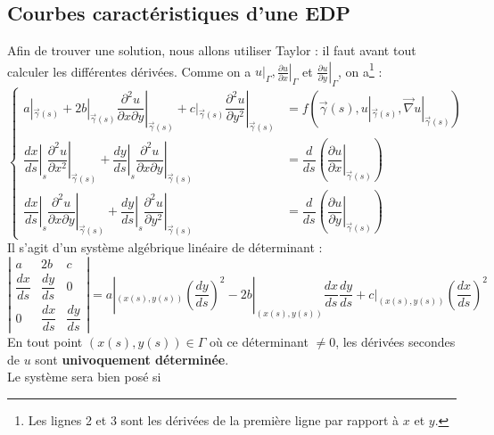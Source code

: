 \documentclass[11pt, a4paper, openany]{book}
\begin{document}
			\subsection{Courbes caractéristiques d'une EDP}
			Afin de trouver une solution, nous allons utiliser Taylor : il faut avant tout calculer les différentes dérivées. Comme on a $u|_\Gamma, \left.\frac{\partial u}{\partial x}\right|_\Gamma$ et $\left.\frac{\partial u}{\partial y}\right|_\Gamma$, on a\footnote{Les lignes 2 et 3 sont les dérivées de la première ligne par rapport à $x$ et $y$.} :
			\begin{equation}
				\left\{\begin{array}{ll}
				a|_{\vec{\gamma}(s)} + 2b|_{\vec{\gamma}(s)}\left.\dfrac{\partial^2 u}{\partial x \partial y}\right|_{\vec{\gamma}(s)} + c|_{\vec{\gamma}(s)}\left.\dfrac{\partial^2u}{\partial y^2}\right|_{\vec{\gamma}(s)} &= f(\vec{\gamma}(s), u|_{\vec{\gamma}(s)}, \vec \nabla u|_{\vec{\gamma}(s)})\\
				\left.\dfrac{dx}{ds}\right|_{s}\left.\dfrac{\partial^2u}{\partial x^2}\right|_{\vec{\gamma}(s)} + \left.\dfrac{dy}{ds}\right|_{s}\left.\dfrac{\partial^2u}{\partial x\partial y}\right|_{\vec{\gamma}(s)} &= \dfrac{d}{ds}\left(\left.\dfrac{\partial u}{\partial x}\right|_{\vec{\gamma}(s)}\right)\\
				\left.\dfrac{dx}{ds}\right|_{s}\left.\dfrac{\partial^2u}{\partial x\partial y}\right|_{\vec{\gamma}(s)} + \left.\dfrac{dy}{ds}\right|_{s}\left.\dfrac{\partial^2u}{\partial y^2}\right|_{\vec{\gamma}(s)} &= \dfrac{d}{ds}\left(\left.\dfrac{\partial u}{\partial y}\right|_{\vec{\gamma}(s)}\right)
				\end{array}\right.
			\end{equation}
			Il s'agit d'un système algébrique linéaire de déterminant  :
			\begin{equation}
				\left|\begin{array}{ccc}
				a & 2b & c\\
				\dfrac{dx}{ds} & \dfrac{dy}{ds} & 0\\
				0 & \dfrac{dx}{ds} & \dfrac{dy}{ds}
				\end{array}\right| = a|_{(x(s),y(s))} \left(\dfrac{dy}{ds}\right)^2 - 2b|_{(x(s),y(s))} \dfrac{dx}{ds}\dfrac{dy}{ds} + c|_{(x(s),y(s))}\left(\dfrac{dx}{ds}\right)^2
			\end{equation}
			En tout point $(x(s),y(s)) \in \Gamma$ où ce déterminant $\neq 0$, les dérivées secondes de $u$ sont \textbf{univoquement déterminée}.\\
			Le système sera bien posé si
\end{document}
